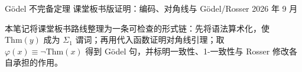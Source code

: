\documentclass[cjk]{loom}
\newcommand{\Thm}{\mathrm{Thm}}
\begin{document}
\loomcover
  {Gödel 不完备定理}
  {课堂板书版证明：编码、对角线与 Gödel/Rosser}
  {}
  {2026 年 9 月}

\begin{strand}
本笔记将课堂板书路线整理为一条可检查的形式链：先将语法算术化，使 \(\Thm(y)\) 成为
\(\Sigma_1\) 谓词；再用代入函数证明对角线引理；取 \(\varphi(x)\equiv\neg\Thm(x)\)
得到 Gödel 句，并标明一致性、1-一致性与 Rosser 修改各自承担的作用。
\end{strand}

\clearpage
{\small\tableofcontents}

\clearpage



\end{document}
